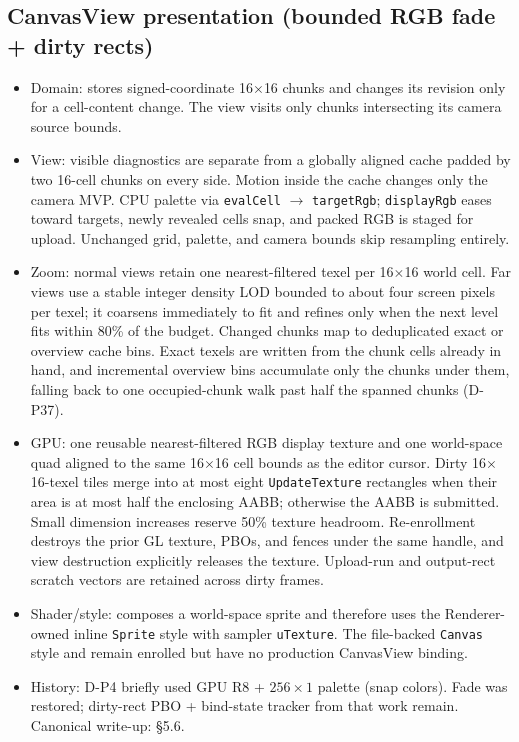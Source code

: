 \subsection{CanvasView presentation (bounded RGB fade + dirty rects)}
\label{sec:canvas-rgb-fade}
\begin{itemize}
  \item Domain:  stores signed-coordinate
        16$\times$16 chunks and changes its revision only for a cell-content
        change. The view visits only chunks intersecting its camera source
        bounds.
  \item View: visible diagnostics are separate from a globally aligned cache
        padded by two 16-cell chunks on every side. Motion inside the cache
        changes only the camera MVP. CPU palette via \texttt{evalCell}
        $\rightarrow$ \texttt{targetRgb};
        \texttt{displayRgb} eases toward targets, newly revealed cells snap,
        and packed RGB is staged for upload. Unchanged grid, palette, and
        camera bounds skip resampling entirely.
  \item Zoom: normal views retain one nearest-filtered texel per 16$\times$16
        world cell. Far views use a stable integer density LOD bounded to about
        four screen pixels per texel; it coarsens immediately to fit and refines
        only when the next level fits within 80\% of the budget. Changed chunks
        map to deduplicated exact or overview cache bins. Exact texels are
        written from the chunk cells already in hand, and incremental overview
        bins accumulate only the chunks under them, falling back to one
        occupied-chunk walk past half the spanned chunks (D-P37).
  \item GPU: one reusable nearest-filtered RGB display texture and one
        world-space quad aligned to the same 16$\times$16 cell bounds as the
        editor cursor. Dirty 16$\times$16-texel tiles merge into at most eight
        \texttt{UpdateTexture} rectangles when their area is at most half the
        enclosing AABB; otherwise the AABB is submitted. Small dimension
        increases reserve 50\% texture headroom. Re-enrollment destroys the
        prior GL texture, PBOs, and fences under the same handle, and view
        destruction explicitly releases the texture. Upload-run and output-rect
        scratch vectors are retained across dirty frames.
  \item Shader/style:  composes a world-space
         sprite and therefore uses the Renderer-owned
        inline \texttt{Sprite} style with sampler \texttt{uTexture}.
        The file-backed \texttt{Canvas} style and
         remain enrolled but have no production
        CanvasView binding.
  \item History: D-P4 briefly used GPU R8 + $256\times 1$ palette (snap colors).
        Fade was restored; dirty-rect PBO + bind-state tracker from that work
        remain. Canonical write-up:
         \S5.6.
\end{itemize}

